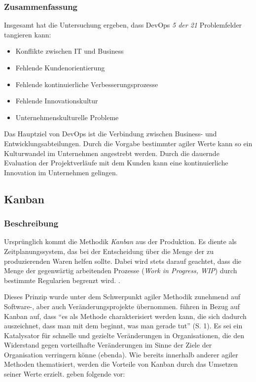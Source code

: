 \subsubsection{Zusammenfassung}

Insgesamt hat die Untersuchung ergeben, dass DevOps \textit{5 der 21} Problemfelder tangieren kann:

\begin{itemize}[noitemsep, topsep=0pt]
	\item Konflikte zwischen IT und Business
	\item Fehlende Kundenorientierung
	\item Fehlende kontinuierliche Verbesserungsprozesse
	\item Fehlende Innovationskultur
	\item Unternehmenskulturelle Probleme
\end{itemize}

Das Hauptziel von DevOps ist die Verbindung zwischen Business- und Entwicklungsabteilungen. Durch die Vorgabe bestimmter agiler Werte kann so ein Kulturwandel im Unternehmen angestrebt werden. Durch die dauernde Evaluation der Projektverläufe mit dem Kunden kann eine kontinuierliche Innovation im Unternehmen gelingen.

\subsection{Kanban}

\subsubsection{Beschreibung}

Ursprünglich kommt die Methodik \textit{Kanban} aus der Produktion.  Es diente als Zeitplanungssystem, das bei der Entscheidung über die Menge der zu produzierenden Waren helfen sollte. Dabei wird stets darauf geachtet, dass die Menge der gegenwärtig arbeitenden Prozesse (\textit{Work in Progress, WIP}) durch bestimmte Regularien begrenzt wird. \cite[S. 12f.]{leopold_kanban_2018}.

Dieses Prinzip wurde unter dem Schwerpunkt agiler Methodik zunehmend auf Software-, aber auch Veränderungsprojekte übernommen.  führen in Bezug auf Kanban auf, dass ``es als Methode charakterisiert werden kann, die sich dadurch auszeichnet, dass man mit dem beginnt, was man gerade tut'' (S. 1). Es sei ein Katalysator für schnelle und gezielte
Veränderungen in Organisationen, die den Widerstand gegen vorteilhafte Veränderungen im Sinne der Ziele der Organisation verringern könne (ebenda). Wie bereits innerhalb anderer agiler Methoden thematisiert, werden die Vorteile von Kanban durch das Umsetzen seiner Werte erzielt.  geben folgende vor:

